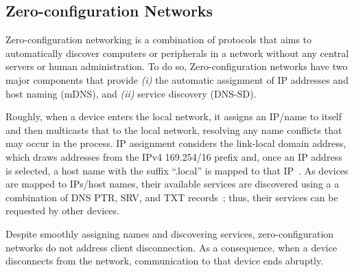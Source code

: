 \subsection{Zero-configuration Networks}
\label{sec:zeroconf}



Zero-configuration networking is a combination of protocols that aims to automatically discover computers or peripherals in a network without any central servers or human administration. To do so, Zero-configuration networks have two major components that provide {\it (i)} the automatic assignment of IP addresses and host naming (mDNS), and {\it (ii)} service discovery (DNS-SD).


Roughly, when a device enters the local network, it assigns an IP/name to itself and then multicasts that to the local network, resolving any name conflicts that may occur in the process. IP assignment considers the link-local domain address, which draws addresses from the IPv4 169.254/16 prefix and, once an IP address is selected, a host name with the suffix ``.local'' is mapped to that IP~\cite{rfc6762}. As devices are mapped to IPs/host names, their available services are discovered using a a combination of DNS PTR, SRV, and TXT records~\cite{rfc6763}; thus, their services can be requested by other devices. 

Despite smoothly assigning names and discovering services, zero-configuration networks do not address client disconnection. As a consequence, when a device disconnects from the network, communication to that device ends abruptly. 


